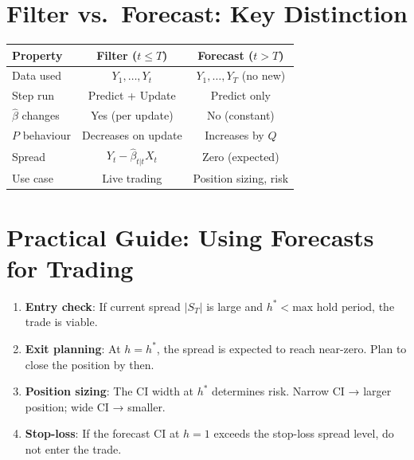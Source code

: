 \documentclass[10pt,a4paper,twocolumn]{article}
\begin{document}
\section{Filter vs.\ Forecast: Key Distinction}

\begin{center}
{\small
\begin{tabular}{@{}lcc@{}}
\toprule
Property & Filter ($t \leq T$) & Forecast ($t > T$)\\\midrule
Data used & $Y_1,\ldots,Y_t$ & $Y_1,\ldots,Y_T$ (no new)\\
Step run & Predict + Update & Predict only\\
$\hat\beta$ changes & Yes (per update) & No (constant)\\
$P$ behaviour & Decreases on update & Increases by $Q$\\
Spread & $Y_t - \hat\beta_{t|t}X_t$ & Zero (expected)\\
Use case & Live trading & Position sizing, risk\\\bottomrule
\end{tabular}
}
\end{center}

\section{Practical Guide: Using Forecasts for Trading}

\begin{tcolorbox}[notebox={When to Act on Forecasts}]
\begin{enumerate}\setlength\itemsep{1pt}
  \item \textbf{Entry check}: If current spread $|S_T|$ is large and
    $h^* < \text{max hold period}$, the trade is viable.
  \item \textbf{Exit planning}: At $h = h^*$, the spread is expected
    to reach near-zero.  Plan to close the position by then.
  \item \textbf{Position sizing}: The CI width at $h^*$ determines
    risk.  Narrow CI → larger position; wide CI → smaller.
  \item \textbf{Stop-loss}: If the forecast CI at $h=1$ exceeds the
    stop-loss spread level, do not enter the trade.
\end{enumerate}
\end{tcolorbox}
\end{document}
